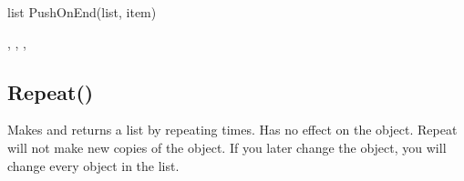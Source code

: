 \documentclass[letterpaper,10pt,english]{sphinxmanual}
\begin{document}
\begin{sphinxVerbatim}[commandchars=\\\{\}]
list \PYGZlt{}\PYGZhy{}  PushOnEnd(list, item)
\end{sphinxVerbatim}

\sphinxAtStartPar
{}

\begin{sphinxVerbatim}[commandchars=\\\{\}]
\end{sphinxVerbatim}

\sphinxAtStartPar
{}

\begin{sphinxVerbatim}[commandchars=\\\{\}]
\PYG{p}{[}\PYG{p}{]}
\PYG{p}{[}\PYG{p}{]}
\end{sphinxVerbatim}

\sphinxAtStartPar
{}

\sphinxAtStartPar
{} , \sphinxcode{\sphinxupquote{{[} {]}()}}, , 

\ignorespaces 

\subsection{Repeat()}
\label{\detokenize{reference/pebllist:repeat}}\label{\detokenize{reference/pebllist:index-17}}
\sphinxAtStartPar
{}

\sphinxAtStartPar
Makes and returns a list by repeating   times.               Has no effect on the object. Repeat will not make new copies            of the object. If you later change the object,                  you will change every object in the list.
\end{document}
